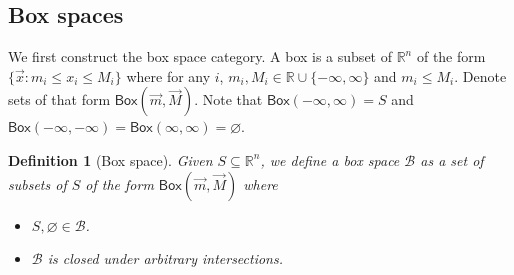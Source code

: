 \documentclass[12pt]{article}
\newtheorem{definition}[theorem]{Definition}
\newtheorem{remark}[theorem]{Remark}
\newcommand{\bspace}{\mathsf{BoxSpace}}
\newcommand{\bobject}{\mathsf{Box}}
\begin{document}
\subsection{Box spaces}
We first construct the box space category.
A box is a subset of $\mathbb{R}^n$ of the form 
$\{\vec{x}:m_i\leq x_i\leq M_i\}$ where for any $i$,
$m_i,M_i\in\mathbb{R}\cup\{-\infty,\infty\}$ and $m_i\leq M_i$.
Denote sets of that form $\bobject(\vec{m},\vec{M})$.
Note that $\bobject(-\infty,\infty)=S$
 and $\bobject(-\infty,-\infty)=\bobject(\infty,\infty)=\varnothing$.
\begin{definition}[Box space]
Given $S\subseteq\mathbb{R}^n$, we define a box space $\mathcal{B}$ as a set
of subsets of $S$ of the form
$\bobject(\vec{m},\vec{M})$ where
\begin{itemize}
    \item $S,\varnothing\in\mathcal{B}$.
    \item $\mathcal{B}$ is closed under arbitrary intersections.
\end{itemize}
\end{definition}
\end{document}
